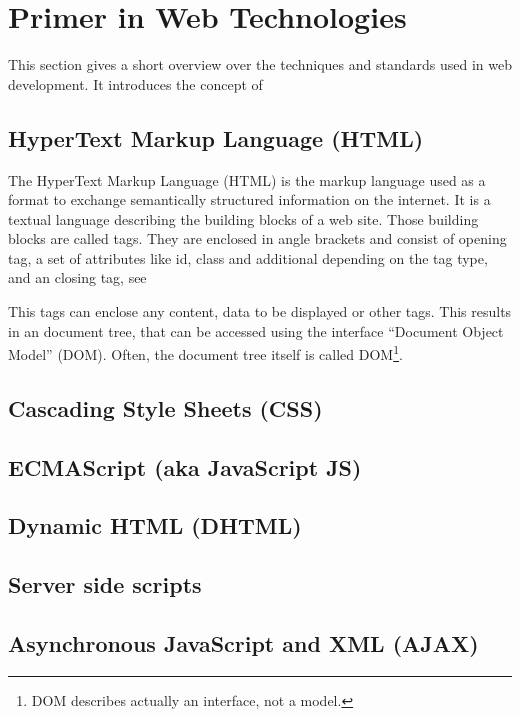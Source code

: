 \section{Primer in Web Technologies}

This section gives a short overview over the techniques and standards used in web development.
It introduces the concept of 


\subsection{HyperText Markup Language (HTML)}
The HyperText Markup Language (HTML) is the markup language used as a format to exchange semantically structured information on the internet.
It is a textual language describing the building blocks of a web site.
Those building blocks are called tags.
They are enclosed in angle brackets and consist of opening tag, a set of attributes like id, class and additional depending on the tag type, and an closing tag, see 


This tags can enclose any content, data to be displayed or other tags. This results in an document tree, that can be accessed using the interface ``Document Object Model'' (DOM). Often, the document tree itself is called DOM\footnote{DOM describes actually an interface, not a model.}.



\subsection{Cascading Style Sheets (CSS)}

\subsection{ECMAScript (aka JavaScript JS)}

\subsection{Dynamic HTML (DHTML)}

\subsection{Server side scripts}

\subsection{Asynchronous JavaScript and XML (AJAX)}

